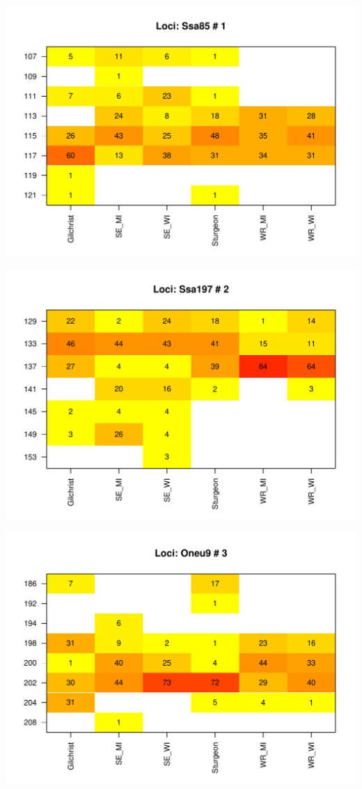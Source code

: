 \documentclass[a4paper]{scrartcl}\usepackage[]{graphicx}\usepackage[]{color}
\makeatletter
\def\maxwidth{ %
  \ifdim\Gin@nat@width>\linewidth
    \linewidth
  \else
    \Gin@nat@width
  \fi
}
\newenvironment{knitrout}{}{} %
\makeatother
\begin{document}
\FloatBarrier
\begin{knitrout}
\color{fgcolor}
\includegraphics[width=\maxwidth]{PopGenReport_Hatchery-heatmap-1} 

\includegraphics[width=\maxwidth]{PopGenReport_Hatchery-heatmap-2} 

\includegraphics[width=\maxwidth]{PopGenReport_Hatchery-heatmap-3} 


\end{knitrout}
\end{document}
